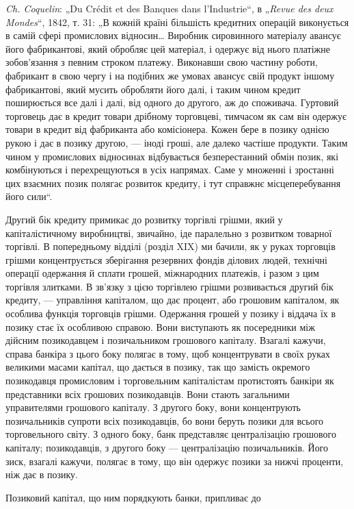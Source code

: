\begin{small}
\emph{Ch. Coquelin}: „Du Crédit et des Banques dans l’Industrie“, в „\emph{Revue des deux Mondes}“,
1842, т. 31: „В кожній країні більшість кредитних операцій виконується в самій
сфері промислових відносин\dots{} Виробник сировинного матеріалу авансує його
фабрикантові, який обробляє цей матеріал, і одержує від нього платіжне зобов’язання
з певним строком платежу. Виконавши свою частину роботи, фабрикант
в свою чергу і на подібних же умовах авансує свій продукт іншому фабрикантові,
який мусить обробляти його далі, і таким чином кредит поширюється все далі і
далі, від одного до другого, аж до споживача. Гуртовий торговець дає в кредит
товари дрібному торговцеві, тимчасом як сам він одержує товари в кредит
від фабриканта або комісіонера. Кожен бере в позику однією рукою і дає в
позику другою, — іноді гроші, але далеко частіше продукти. Таким чином у промислових
відносинах відбувається безперестанний обмін позик, які комбінуються
і перехрещуються в усіх напрямах. Саме у множенні і зростанні цих взаємних
позик полягає розвиток кредиту, і тут справжнє місцеперебування його сили“.
\end{small}

\noindent{}Другий бік кредиту примикає до розвитку торгівлі грішми,
який у капіталістичному виробництві, звичайно, іде паралельно
з розвитком товарної торгівлі. В попередньому відділі (розділ XIX)
ми бачили, як у руках торговців грішми концентрується зберігання
резервних фондів ділових людей, технічні операції одержання
й сплати грошей, міжнародних платежів, і разом з цим
торгівля злитками. В зв’язку з цією торгівлею грішми розвивається
другий бік кредиту, — управління капіталом, що дає процент,
або грошовим капіталом, як особлива функція торговців
грішми. Одержання грошей у позику і віддача їх в позику стає
їх особливою справою. Вони виступають як посередники між дійсним
позикодавцем і позичальником грошового капіталу. Взагалі
кажучи, справа банкіра з цього боку полягає в тому,
щоб концентрувати в своїх руках великими масами капітал, що
дається в позику, так що замість окремого позикодавця промисловим
і торговельним капіталістам протистоять банкіри як представники
всіх грошових позикодавців. Вони стають загальними
управителями грошового капіталу. З другого боку, вони концентрують
позичальників супроти всіх позикодавців, бо вони
беруть позики для всього торговельного світу. З одного боку,
банк представляє централізацію грошового капіталу; позикодавців,
з другого боку — централізацію позичальників. Його зиск,
взагалі кажучи, полягає в тому, що він одержує позики за нижчі
проценти, ніж дає в позику.

Позиковий капітал, що ним порядкують банки, припливає до
\parbreak{}  %
